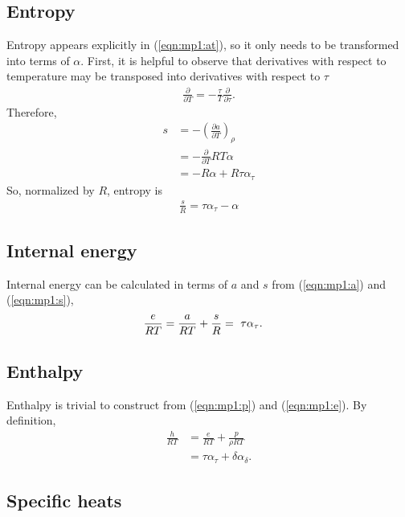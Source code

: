 \subsection{Entropy}\label{sec:mp1:s}

Entropy appears explicitly in (\ref{eqn:mp1:at}), so it only needs to be transformed into terms of $\alpha$.  First, it is helpful to observe that derivatives with respect to temperature may be transposed into derivatives with respect to $\tau$ 
\begin{align}
\frac{\partial}{\partial T} = -\frac{\tau}{T} \frac{\partial}{\partial \tau}.\nonumber
\end{align}
Therefore, 
\begin{align}
s &= -\left(\frac{\partial a}{\partial T}\right)_\rho \nonumber\\
&= -\frac{\partial}{\partial T} R T \alpha\nonumber\\
&= -R \alpha + R \tau \alpha_\tau
\end{align}
So, normalized by $R$, entropy is
\begin{align}
\frac{s}{R} = \tau \alpha_\tau - \alpha\label{eqn:mp1:s}
\end{align}

\subsection{Internal energy}\label{sec:mp1:e}

Internal energy can be calculated in terms of $a$ and $s$ from (\ref{eqn:mp1:a}) and (\ref{eqn:mp1:s}),
\begin{align}
\frac{e}{R T} &= \frac{a}{RT} + \frac{s}{R} \vspace{2em} =\ \tau \alpha_\tau\label{eqn:mp1:e}.
\end{align}

\subsection{Enthalpy}\label{sec:mp1:h}

Enthalpy is trivial to construct from (\ref{eqn:mp1:p}) and (\ref{eqn:mp1:e}).  By definition, 
\begin{align}
\frac{h}{R T} &= \frac{e}{RT} + \frac{p}{\rho R T}\nonumber\\
 &= \tau \alpha_\tau + \delta \alpha_\delta.\label{eqn:mp1:h}
\end{align}

\subsection{Specific heats}\label{sec:mp1:c}

